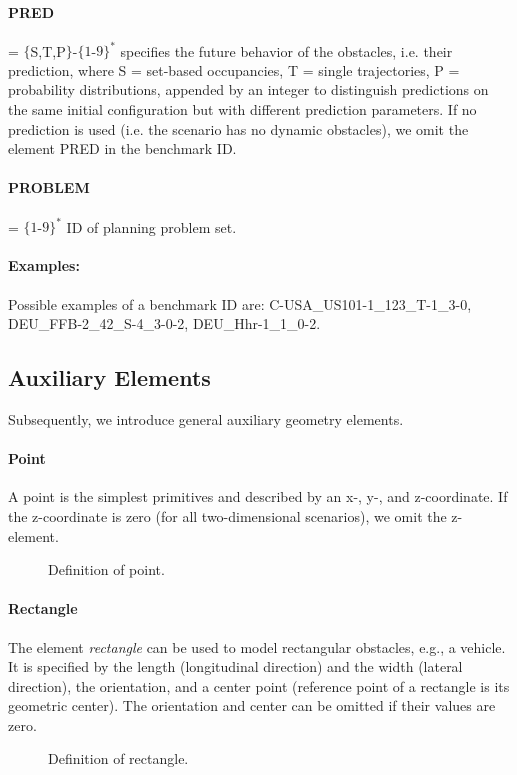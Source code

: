 \paragraph{PRED} = $\{$S,T,P$\}$-$\{1$-$9\}^*$ specifies the future behavior of the obstacles, i.e. their prediction, where S = set-based occupancies, T = single trajectories, P = probability distributions, appended by an integer to distinguish predictions on the same initial configuration but with different prediction parameters.
If no prediction is used (i.e. the scenario has no dynamic obstacles), we omit the element PRED in the benchmark ID.

\paragraph{PROBLEM} = $\{1$-$9\}^*$ ID of planning problem set.

\paragraph{Examples:} Possible examples of a benchmark ID are: C-USA\_US101-1\_123\_T-1\_3-0, DEU\_FFB-2\_42\_S-4\_3-0-2, DEU\_Hhr-1\_1\_0-2.

\subsection{Auxiliary Elements} \label{subsec:auxiliary}

Subsequently, we introduce general auxiliary geometry elements.

\paragraph{Point}
A point is the simplest primitives and described by an x-, y-, and z-coordinate.
If the z-coordinate is zero (for all two-dimensional scenarios), we omit the z-element.
\begin{figure}[!htpb]
	\small
	\caption{Definition of point.}
	\label{fig:auxiliary}
\end{figure}


\paragraph{Rectangle}
The element \textit{rectangle} can be used to model rectangular obstacles, e.g., a vehicle.
It is specified by the length (longitudinal direction) and the width (lateral direction), the orientation, and a center point (reference point of a rectangle is its geometric center).
The orientation and center can be omitted if their values are zero.
\begin{figure}[!htpb]
	\small
	\caption{Definition of rectangle.}
	\label{fig:auxiliary}
\end{figure}



